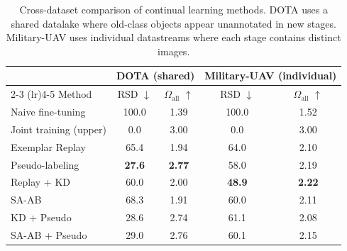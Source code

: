 \begin{table}[t]
\centering
\caption{Cross-dataset comparison of continual learning methods. DOTA
uses a shared datalake where old-class objects appear unannotated in new
stages. Military-UAV uses individual datastreams where each stage contains
distinct images.}
\label{tab:cross-dataset}
\begin{tabular}{l cc cc}
\toprule
            & \multicolumn{2}{c}{DOTA (shared)} & \multicolumn{2}{c}{Military-UAV (individual)} \\
\cmidrule(lr){2-3} \cmidrule(lr){4-5}
Method      & RSD $\downarrow$ & $\Omega_{\text{all}}$ $\uparrow$ & RSD $\downarrow$ & $\Omega_{\text{all}}$ $\uparrow$ \\
\midrule
  Naive fine-tuning          & 100.0 & 1.39 & 100.0 & 1.52 \\
  Joint training (upper)     & 0.0 & 3.00 & 0.0 & 3.00 \\
  \midrule
  Exemplar Replay            & 65.4 & 1.94 & 64.0 & 2.10 \\
  Pseudo-labeling            & \textbf{27.6} & \textbf{2.77} & 58.0 & 2.19 \\
  Replay + KD                & 60.0 & 2.00 & \textbf{48.9} & \textbf{2.22} \\
  SA-AB                      & 68.3 & 1.91 & 60.0 & 2.11 \\
  \midrule
  KD + Pseudo                & 28.6 & 2.74 & 61.1 & 2.08 \\
  SA-AB + Pseudo             & 29.0 & 2.76 & 60.1 & 2.15 \\
\bottomrule
\end{tabular}
\end{table}
